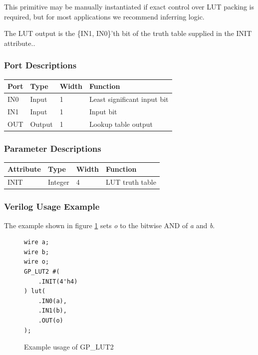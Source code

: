 \documentclass{article}
\begin{document}
This primitive may be manually instantiated if exact control over LUT packing is required, but for most applications we 
recommend inferring logic.

The LUT output is the \{IN1, IN0\}'th bit of the truth table supplied in the INIT attribute..

\subsubsection{Port Descriptions}

\begin{tabularx}{4in}{|l|l|l|X|}
\hline
{\bfseries Port} & {\bfseries Type} & {\bfseries Width} & {\bfseries Function} \\
\hline
IN0 & Input & 1 & Least significant input bit \\
\hline
IN1 & Input & 1 & Input bit \\
\hline
OUT & Output & 1 & Lookup table output \\
\hline
\end{tabularx}

\subsubsection{Parameter Descriptions}

\begin{tabularx}{4in}{|l|l|l|X|}
\hline
{\bfseries Attribute} & {\bfseries Type} & {\bfseries Width} & {\bfseries Function} \\
\hline
INIT & Integer & 4 & LUT truth table \\
\hline
\end{tabularx}

\subsubsection{Verilog Usage Example}

The example shown in figure \ref{gp-lut2-example} sets \emph{o} to the bitwise AND of \emph{a} and \emph{b}.

\begin{figure}[h]
\begin{lstlisting}
wire a;
wire b;
wire o;
GP_LUT2 #(
	.INIT(4'h4)
) lut(
	.IN0(a),
	.IN1(b),
	.OUT(o)
);
\end{lstlisting}
\caption{Example usage of GP\_LUT2}
\label{gp-lut2-example}
\end{figure}

\end{document}
